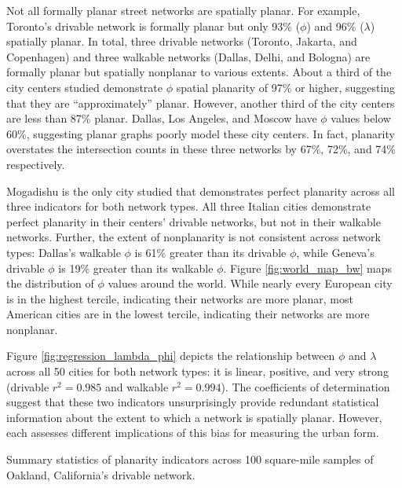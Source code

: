 \documentclass[Afour,sageh,times]{sagej}
\begin{document}
Not all formally planar street networks are spatially planar. For example, Toronto's drivable network is formally planar but only 93\% ($\phi$) and 96\% ($\lambda$) spatially planar. In total, three drivable networks (Toronto, Jakarta, and Copenhagen) and three walkable networks (Dallas, Delhi, and Bologna) are formally planar but spatially nonplanar to various extents. About a third of the city centers studied demonstrate $\phi$ spatial planarity of 97\% or higher, suggesting that they are \enquote{approximately} planar. However, another third of the city centers are less than 87\% planar. Dallas, Los Angeles, and Moscow have $\phi$ values below 60\%, suggesting planar graphs poorly model these city centers. In fact, planarity overstates the intersection counts in these three networks by 67\%, 72\%, and 74\% respectively.

Mogadishu is the only city studied that demonstrates perfect planarity across all three indicators for both network types. All three Italian cities demonstrate perfect planarity in their centers' drivable networks, but not in their walkable networks. Further, the extent of nonplanarity is not consistent across network types: Dallas's walkable $\phi$ is 61\% greater than its drivable $\phi$, while Geneva's drivable $\phi$ is 19\% greater than its walkable $\phi$. Figure \ref{fig:world_map_bw} maps the distribution of $\phi$ values around the world. While nearly every European city is in the highest tercile, indicating their networks are more planar, most American cities are in the lowest tercile, indicating their networks are more nonplanar.

Figure \ref{fig:regression_lambda_phi} depicts the relationship between $\phi$ and $\lambda$ across all 50 cities for both network types: it is linear, positive, and very strong (drivable $r^2=0.985$ and walkable $r^2=0.994$). The coefficients of determination suggest that these two indicators unsurprisingly provide redundant statistical information about the extent to which a network is spatially planar. However, each assesses different implications of this bias for measuring the urban form.

\begin{table}[htbp]
	\centering
	\caption{Summary statistics of planarity indicators across 100 square-mile samples of Oakland, California's drivable network.}
	\label{tab:samples_city}
	
\end{table}
\end{document}

